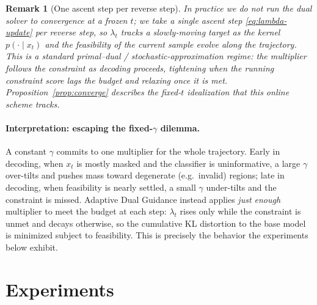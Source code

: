 \documentclass{article}
\newtheorem{remark}{Remark}
\begin{document}
\begin{remark}[One ascent step per reverse step]
In practice we do not run the dual solver to convergence at a frozen $t$; we take a \emph{single} ascent step \eqref{eq:lambda-update} per reverse step, so $\lambda_t$ tracks a slowly-moving target as the kernel $p(\cdot\mid x_t)$ and the feasibility of the current sample evolve along the trajectory. This is a standard primal--dual / stochastic-approximation regime: the multiplier follows the constraint as decoding proceeds, tightening when the running constraint score lags the budget and relaxing once it is met. Proposition~\ref{prop:converge} describes the fixed-$t$ idealization that this online scheme tracks.
\end{remark}

\paragraph{Interpretation: escaping the fixed-$\gamma$ dilemma.} A constant $\gamma$ commits to one multiplier for the whole trajectory. Early in decoding, when $x_t$ is mostly masked and the classifier is uninformative, a large $\gamma$ over-tilts and pushes mass toward degenerate (e.g.\ invalid) regions; late in decoding, when feasibility is nearly settled, a small $\gamma$ under-tilts and the constraint is missed. Adaptive Dual Guidance instead applies \emph{just enough} multiplier to meet the budget at each step: $\lambda_t$ rises only while the constraint is unmet and decays otherwise, so the cumulative KL distortion to the base model is minimized subject to feasibility. This is precisely the behavior the experiments below exhibit.

\section{Experiments}
\label{sec:experiments}
\end{document}
